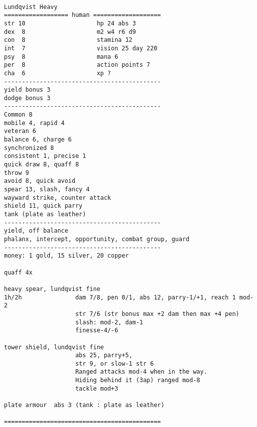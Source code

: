\

\goodbreak \small \begin{samepage} \begin{verbatim}
Lundqvist Heavy
================== human ===================
str 10                    hp 24 abs 3
dex  8                    m2 w4 r6 d9
con  8                    stamina 12
int  7                    vision 25 day 220
psy  8                    mana 6
per  8                    action points 7
cha  6                    xp ?
--------------------------------------------
yield bonus 3
dodge bonus 3
--------------------------------------------
Common 8
mobile 4, rapid 4
veteran 6
balance 6, charge 6
synchronized 8
consistent 1, precise 1
quick draw 8, quaff 8
throw 9
avoid 8, quick avoid
spear 13, slash, fancy 4
wayward strike, counter attack
shield 11, quick parry
tank (plate as leather)
--------------------------------------------
yield, off balance
phalanx, intercept, opportunity, combat group, guard
--------------------------------------------
money: 1 gold, 15 silver, 20 copper

quaff 4x

heavy spear, lundqvist fine
1h/2h               dam 7/8, pen 0/1, abs 12, parry-1/+1, reach 1 mod-2
                    str 7/6 (str bonus max +2 dam then max +4 pen)
                    slash: mod-2, dam-1
                    finesse-4/-6
                    
tower shield, lundqvist fine
                    abs 25, parry+5,
                    str 9, or slow-1 str 6
                    Ranged attacks mod-4 when in the way.
                    Hiding behind it (3ap) ranged mod-8
                    tackle mod+3

plate armour  abs 3 (tank : plate as leather)

============================================
\end{verbatim} \end{samepage} \normalsize

\

